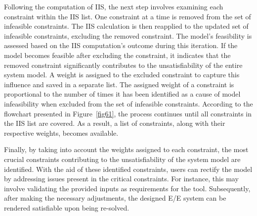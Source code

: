     Following the computation of IIS, the next step involves examining each constraint within the IIS list. One constraint at a time is removed from the set of infeasible constraints. The IIS calculation is then reapplied to the updated set of infeasible constraints, excluding the removed constraint. The model's feasibility is assessed based on the IIS computation's outcome during this iteration. If the model becomes feasible after excluding the constraint, it indicates that the removed constraint significantly contributes to the unsatisfiability of the entire system model.
    A weight is assigned to the excluded constraint to capture this influence and saved in a separate list. The assigned weight of a constraint is proportional to the number of times it has been identified as a cause of model infeasibility when excluded from the set of infeasible constraints. According to the flowchart presented in Figure~\ref{fig61}, the process continues until all constraints in the IIS list are covered. As a result, a list of constraints, along with their respective weights, becomes available.
    
   
    
    Finally, by taking into account the weights assigned to each constraint, the most crucial constraints contributing to the unsatisfiability of the system model are identified. With the aid of these identified constraints, users can rectify the model by addressing issues present in the critical constraints. For instance, this may involve validating the provided inputs as requirements for the tool. Subsequently, after making the necessary adjustments, the designed E/E system can be rendered satisfiable upon being re-solved.
    

    
